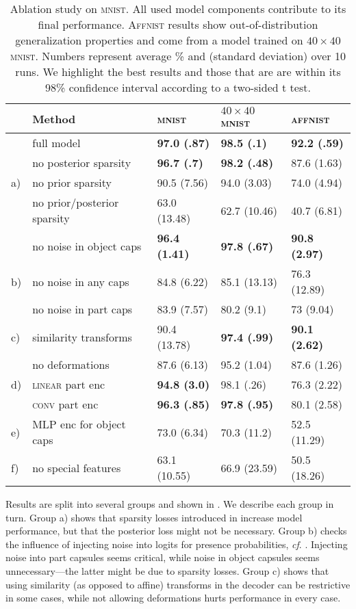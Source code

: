 \begin{table}
\centering
    \caption{
        Ablation study on \textsc{mnist}. All used model components contribute to its final performance. \textsc{Affnist} results show out-of-distribution generalization properties and come from a model trained on $40\times40$ \textsc{mnist}. Numbers represent average \% and (standard deviation) over 10 runs. We highlight the best results and those that are are within its 98\% confidence interval according to a two-sided t test.
    }
    \label{tab:ablation}
    {\small
    \begin{tabular}{@{}lllll@{}}
        & Method & \textsc{mnist} & $40\times40$ \textsc{mnist} & \textsc{affnist} \\
        \midrule
        &full model & \textbf{97.0 (.87)} & \textbf{98.5 (.1)} & \textbf{92.2 (.59)} \\
        \midrule
        & no posterior sparsity  & \textbf{96.7	(.7)} & \textbf{98.2	(.48)} & 87.6	(1.63) \\
        a)& no prior sparsity  & 90.5 (7.56) & 94.0	(3.03) & 74.0	(4.94) \\
        & no prior/posterior sparsity  &	63.0	(13.48) &	62.7	(10.46) & 40.7 (6.81)\\
        \midrule
        & no noise in object caps &	\textbf{96.4	(1.41)} &	\textbf{97.8	(.67)} &	\textbf{90.8	(2.97)}\\
        b)& no noise in any caps &	84.8	(6.22) &	85.1	(13.13) &	76.3	(12.89)\\
        &no noise in part caps	& 83.9	(7.57) &	80.2	(9.1) &	73	(9.04)\\
        \midrule
        c)& similarity transforms &	90.4	(13.78) &	\textbf{97.4	(.99)} &	\textbf{90.1	(2.62)}\\
        &no deformations	& 87.6	(6.13) &	95.2	(1.04) &	87.6	(1.26)\\
        \midrule
        d)&\textsc{linear} part enc & \textbf{94.8	(3.0)} &	98.1	(.26)	& 76.3	(2.22)\\
        &\textsc{conv} part enc &	\textbf{96.3	(.85)} &	\textbf{97.8	(.95)} &	80.1	(2.58)\\
        \midrule
        e)& \gls{MLP} enc for object caps	& 73.0	(6.34) &	70.3	(11.2) &	52.5	(11.29)\\
        f)& no special features &	63.1	(10.55) &	66.9	(23.59) &	50.5	(18.26)\\
    \end{tabular}
	}
\end{table}
Results are split into several groups and shown in .
We describe each group in turn.
Group a) shows that sparsity losses introduced in  increase model performance, but that the posterior loss might not be necessary.
Group b) checks the influence of injecting noise into logits for presence probabilities, \textit{cf}. .  Injecting noise into part capsules seems critical, while noise in object capsules seems unnecessary---the latter might be due to sparsity losses.
Group c) shows that using similarity (as opposed to affine) transforms in the decoder can be restrictive in some cases, while not allowing deformations hurts performance in every case.

